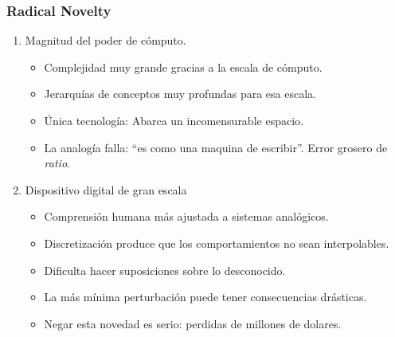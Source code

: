 \documentclass[ignorenonframetext,]{beamer}
\begin{document}
\begin{frame}\frametitle{Radical Novelty}

\begin{enumerate}[<+->]
\def\labelenumi{\arabic{enumi}.}
\itemsep1pt\parskip0pt
\item
  Magnitud del poder de cómputo.

  \begin{itemize}[<+->]
  \itemsep1pt\parskip0pt
  \item
    Complejidad muy grande gracias a la escala de cómputo.
  \item
    Jerarquías de conceptos muy profundas para esa escala.
  \item
    Única tecnología: Abarca un incomensurable espacio.
  \item
    La analogía falla: ``es como una maquina de escribir''. Error
    grosero de \emph{ratio}.
  \end{itemize}
\item
  Dispositivo digital de gran escala

  \begin{itemize}[<+->]
  \itemsep1pt\parskip0pt
  \item
    Comprensión humana más ajustada a sistemas analógicos.
  \item
    Discretización produce que los comportamientos no sean
    interpolables.
  \item
    Dificulta hacer suposiciones sobre lo desconocido.
  \item
    La más mínima perturbación puede tener consecuencias drásticas.
  \item
    Negar esta novedad es serio: perdidas de millones de dolares.
  \end{itemize}
\end{enumerate}

\end{frame}
\end{document}
